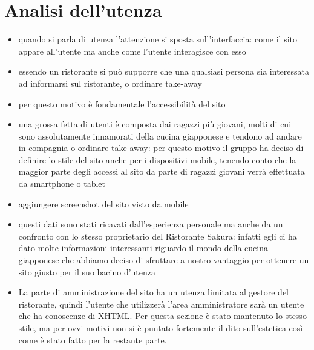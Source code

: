 \documentclass[../relazione.tex]{subfiles}
\begin{document}
\section{Analisi dell'utenza}
	\begin{itemize}
		\item quando si parla di utenza l'attenzione si sposta sull'interfaccia: come il sito appare all'utente ma anche come l'utente interagisce con esso
		\item essendo un ristorante si può supporre che una qualsiasi persona sia interessata ad informarsi sul ristorante, o ordinare take-away
		\item per questo motivo è fondamentale l'accessibilità del sito
		\item una grossa fetta di utenti è composta dai ragazzi più giovani, molti di cui sono assolutamente innamorati della cucina giapponese e tendono ad andare in compagnia o ordinare take-away: per questo motivo il gruppo ha deciso di definire lo stile del sito anche per i dispositivi mobile, tenendo conto che la maggior parte degli accessi al sito da parte di ragazzi giovani verrà effettuata da smartphone o tablet
		\item aggiungere screenshot del sito visto da mobile
		\item questi dati sono stati ricavati dall'esperienza personale ma anche da un confronto con lo stesso proprietario del Ristorante Sakura: infatti egli ci ha dato molte informazioni interessanti riguardo il mondo della cucina giapponese che abbiamo deciso di sfruttare a nostro vantaggio per ottenere un sito giusto per il suo bacino d'utenza
		\item La parte di amministrazione del sito ha un utenza limitata al gestore del ristorante, quindi l'utente che utilizzerà l'area amministratore sarà un utente che ha conoscenze di XHTML. Per questa sezione è stato mantenuto lo stesso stile, ma per ovvi motivi non si è puntato fortemente il dito sull'estetica così come è stato fatto per la restante parte. 
	\end{itemize}
\end{document}

